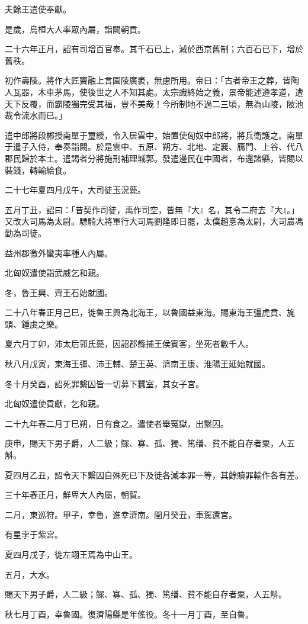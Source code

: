 \begin{pinyinscope}
夫餘王遣使奉獻。

是歲，烏桓大人率眾內屬，詣闕朝貢。

二十六年正月，詔有司增百官奉。其千石已上，減於西京舊制；六百石已下，增於舊秩。

初作壽陵。將作大匠竇融上言園陵廣袤，無慮所用。帝曰：「古者帝王之葬，皆陶人瓦器，木車茅馬，使後世之人不知其處。太宗識終始之義，景帝能述遵孝道，遭天下反覆，而霸陵獨完受其福，豈不美哉！今所制地不過二三頃，無為山陵，陂池裁令流水而已。」

遣中郎將段郴授南單于璽綬，令入居雲中，始置使匈奴中郎將，將兵衛護之。南單于遣子入侍，奉奏詣闕。於是雲中、五原、朔方、北地、定襄、鴈門、上谷、代八郡民歸於本土。遣謁者分將施刑補理城郭。發遣邊民在中國者，布還諸縣，皆賜以裝錢，轉輸給食。

二十七年夏四月戊午，大司徒玉況薨。

五月丁丑，詔曰：「昔契作司徒，禹作司空，皆無『大』名，其令二府去『大』。」又改大司馬為太尉。驃騎大將軍行大司馬劉隆即日罷，太僕趙憙為太尉，大司農馮勤為司徒。

益州郡徼外蠻夷率種人內屬。

北匈奴遣使詣武威乞和親。

冬，魯王興、齊王石始就國。

二十八年春正月己巳，徙魯王興為北海王，以魯國益東海。賜東海王彊虎賁、旄頭、鍾虡之樂。

夏六月丁卯，沛太后郭氏薨，因詔郡縣捕王侯賓客，坐死者數千人。

秋八月戊寅，東海王彊、沛王輔、楚王英、濟南王康、淮陽王延始就國。

冬十月癸酉，詔死罪繫囚皆一切募下蠶室，其女子宮。

北匈奴遣使貢獻，乞和親。

二十九年春二月丁巳朔，日有食之。遣使者舉冤獄，出繫囚。

庚申，賜天下男子爵，人二級；鰥、寡、孤、獨、篤缮、貧不能自存者粟，人五斛。

夏四月乙丑，詔令天下繫囚自殊死已下及徒各減本罪一等，其餘贖罪輸作各有差。

三十年春正月，鮮卑大人內屬，朝賀。

二月，東巡狩。甲子，幸魯，進幸濟南。閏月癸丑，車駕還宮。

有星孛于紫宮。

夏四月戊子，徙左翊王焉為中山王。

五月，大水。

賜天下男子爵，人二級；鰥、寡、孤、獨、篤缮、貧不能自存者粟，人五斛。

秋七月丁酉，幸魯國。復濟陽縣是年傜役。冬十一月丁酉，至自魯。


\end{pinyinscope}
